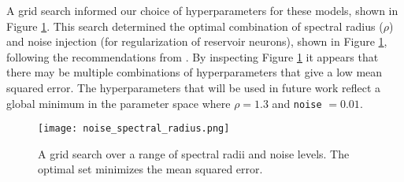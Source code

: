 A grid search informed our choice of hyperparameters for these models, shown in
Figure \ref{fig:gridsearch}. This search determined the optimal combination of
spectral radius ($\rho$) and noise injection (for regularization of reservoir
neurons), shown in Figure \ref{fig:gridsearch}, following the recommendations
from \cite{lukosevicius_practical_2012}. By inspecting Figure
\ref{fig:gridsearch} it appears that there may be multiple combinations of
hyperparameters that give a low mean squared error. The hyperparameters that
will be used in future work reflect a global minimum in the parameter space
where $\rho = 1.3$ and \texttt{noise} $= 0.01$. 

\begin{figure}[h]
  \centering
  \texttt{[image: noise\_spectral\_radius.png]}
  \caption{A grid search over a range of spectral radii and noise levels. The
  optimal set minimizes the mean squared error.}
  \label{fig:gridsearch}
\end{figure}
